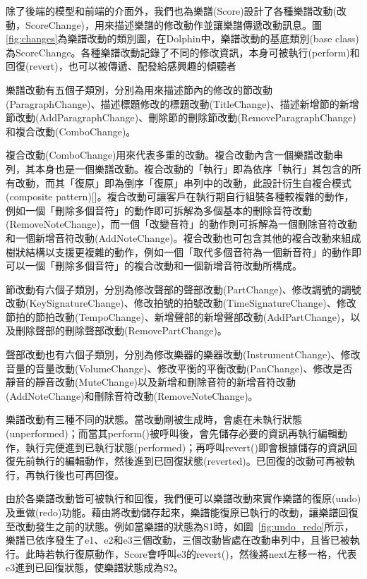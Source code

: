 \documentclass[12pt,a4paper,oneside]{report}
\begin{document}
除了後端的模型和前端的介面外，我們也為樂譜(Score)設計了各種樂譜改動(改動，ScoreChange)，用來描述樂譜的修改動作並讓樂譜傳遞改動訊息。圖 \ref{fig:changes}為樂譜改動的類別圖，在Dolphin中，樂譜改動的基底類別(base class)為ScoreChange。各種樂譜改動記錄了不同的修改資訊，本身可被執行(perform)和回復(revert)，也可以被傳遞、配發給感興趣的傾聽者

樂譜改動有五個子類別，分別為用來描述節內的修改的節改動(ParagraphChange)、描述標題修改的標題改動(TitleChange)、描述新增節的新增節改動(AddParagraphChange)、刪除節的刪除節改動(RemoveParagraphChange)和複合改動(ComboChange)。

複合改動(ComboChange)用來代表多重的改動。複合改動內含一個樂譜改動串列，其本身也是一個樂譜改動。複合改動的「執行」即為依序「執行」其包含的所有改動，而其「復原」即為倒序「復原」串列中的改動，此設計衍生自複合模式(composite pattern)[]。複合改動可讓客戶在執行期自行組裝各種較複雜的動作，例如一個「刪除多個音符」的動作即可拆解為多個基本的刪除音符改動(RemoveNoteChange)，而一個「改變音符」的動作則可拆解為一個刪除音符改動和一個新增音符改動(AddNoteChange)。複合改動也可包含其他的複合改動來組成樹狀結構以支援更複雜的動作，例如一個「取代多個音符為一個新音符」的動作即可以一個「刪除多個音符」的複合改動和一個新增音符改動所構成。

節改動有六個子類別，分別為修改聲部的聲部改動(PartChange)、修改調號的調號改動(KeySignatureChange)、修改拍號的拍號改動(TimeSignatureChange)、修改節拍的節拍改動(TempoChange)、新增聲部的新增聲部改動(AddPartChange)，以及刪除聲部的刪除聲部改動(RemovePartChange)。

聲部改動也有六個子類別，分別為修改樂器的樂器改動(InstrumentChange)、修改音量的音量改動(VolumeChange)、修改平衡的平衡改動(PanChange)、修改是否靜音的靜音改動(MuteChange)以及新增和刪除音符的新增音符改動(AddNoteChange)和刪除音符改動(RemoveNoteChange)。

樂譜改動有三種不同的狀態。當改動剛被生成時，會處在未執行狀態(unperformed)；而當其perform()被呼叫後，會先儲存必要的資訊再執行編輯動作，執行完便進到已執行狀態(performed)；再呼叫revert()即會根據儲存的資訊回復先前執行的編輯動作，然後進到已回復狀態(reverted)。已回復的改動可再被執行，再執行後也可再回復。

由於各樂譜改動皆可被執行和回復，我們便可以樂譜改動來實作樂譜的復原(undo)及重做(redo)功能。藉由將改動儲存起來，樂譜能復原已執行的改動，讓樂譜回復至改動發生之前的狀態。例如當樂譜的狀態為S1時，如圖~\ref{fig:undo_redo}所示，樂譜已依序發生了e1、e2和e3三個改動，三個改動皆處在改動串列中，且皆已被執行。此時若執行復原動作，Score會呼叫e3的revert()，然後將next左移一格，代表e3進到已回復狀態，使樂譜狀態成為S2。
\end{document}
